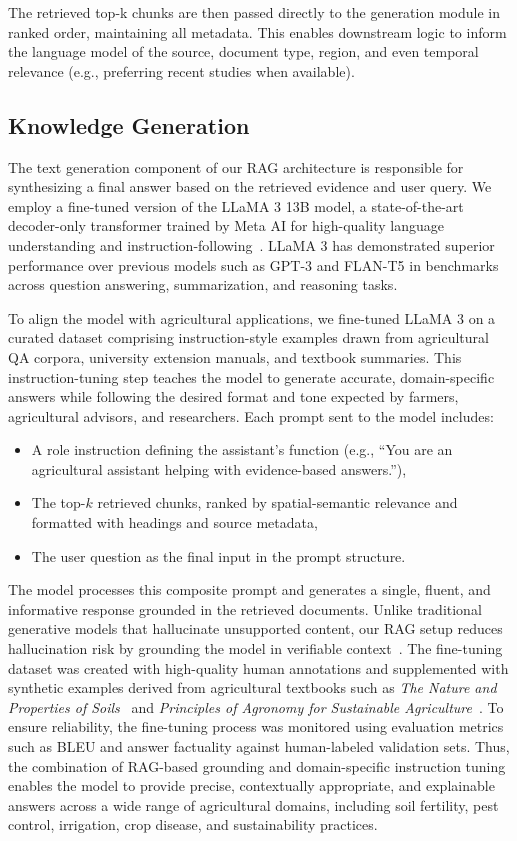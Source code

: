 \documentclass{ieeeaccess}
\begin{document}
The retrieved top-k chunks are then passed directly to the generation module in ranked order, maintaining all metadata. This enables downstream logic to inform the language model of the source, document type, region, and even temporal relevance (e.g., preferring recent studies when available).


\subsection{Knowledge Generation}

The text generation component of our RAG architecture is responsible for synthesizing a final answer based on the retrieved evidence and user query. We employ a fine-tuned version of the LLaMA 3 13B model, a state-of-the-art decoder-only transformer trained by Meta AI for high-quality language understanding and instruction-following~\cite{touvron2023llama}. LLaMA 3 has demonstrated superior performance over previous models such as GPT-3 and FLAN-T5 in benchmarks across question answering, summarization, and reasoning tasks.

To align the model with agricultural applications, we fine-tuned LLaMA 3 on a curated dataset comprising instruction-style examples drawn from agricultural QA corpora, university extension manuals, and textbook summaries. This instruction-tuning step teaches the model to generate accurate, domain-specific answers while following the desired format and tone expected by farmers, agricultural advisors, and researchers.
Each prompt sent to the model includes:
\begin{itemize}
  \item A role instruction defining the assistant's function (e.g., ``You are an agricultural assistant helping with evidence-based answers.''),
  \item The top-$k$ retrieved chunks, ranked by spatial-semantic relevance and formatted with headings and source metadata,
  \item The user question as the final input in the prompt structure.
\end{itemize}

The model processes this composite prompt and generates a single, fluent, and informative response grounded in the retrieved documents. Unlike traditional generative models that hallucinate unsupported content, our RAG setup reduces hallucination risk by grounding the model in verifiable context~\cite{lewis2020rag, guu2020realm}. The fine-tuning dataset was created with high-quality human annotations and supplemented with synthetic examples derived from agricultural textbooks such as \textit{The Nature and Properties of Soils}~\cite{bradyweilsol} and \textit{Principles of Agronomy for Sustainable Agriculture}~\cite{reddyagronomy}. To ensure reliability, the fine-tuning process was monitored using evaluation metrics such as BLEU and answer factuality against human-labeled validation sets. Thus, the combination of RAG-based grounding and domain-specific instruction tuning enables the model to provide precise, contextually appropriate, and explainable answers across a wide range of agricultural domains, including soil fertility, pest control, irrigation, crop disease, and sustainability practices.
\end{document}
